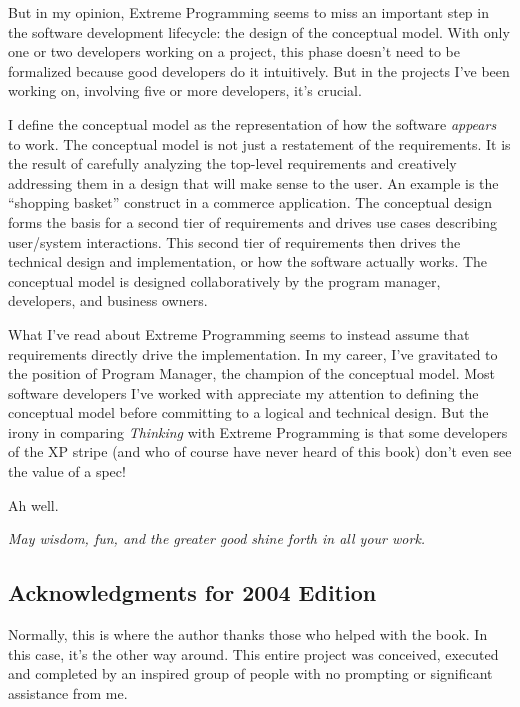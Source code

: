 But in my opinion, Extreme Programming seems to miss an important step
in the software development lifecycle: the design of the conceptual
model. With only one or two developers working on a project, this
phase doesn't need to be formalized because good developers do it
intuitively. But in the projects I've been working on, involving five
or more developers, it's crucial.

I define the conceptual model as the representation of how the
software \emph{appears} to work. The conceptual model is not just a
restatement of the requirements. It is the result of carefully
analyzing the top-level requirements and creatively addressing them in
a design that will make sense to the user. An example is the
``shopping basket'' construct in a commerce application. The
conceptual design forms the basis for a second tier of requirements
and drives use cases describing user/system interactions. This second
tier of requirements then drives the technical design and
implementation, or how the software actually works. The conceptual
model is designed collaboratively by the program manager, developers,
and business owners.

What I've read about Extreme Programming seems to instead assume that
requirements directly drive the implementation. In my career, I've
gravitated to the position of Program Manager, the champion of the
conceptual model. Most software developers I've worked with appreciate
my attention to defining the conceptual model before committing to a
logical and technical design. But the irony in comparing \emph{Thinking
\Forth{}} with Extreme Programming is that some developers of the XP
stripe (and who of course have never heard of this book) don't even
see the value of a spec!

Ah well.

\begin{flushright}
\emph{May wisdom, fun, and the greater good shine forth in all your work.}

\vspace{5em}
\vspace{2.5em}
\end{flushright}

\subsection{Acknowledgments for 2004 Edition}

Normally, this is where the author thanks those who helped with the
book. In this case, it's the other way around. This entire project was
conceived, executed and completed by an inspired group of people with
no prompting or significant assistance from me.

